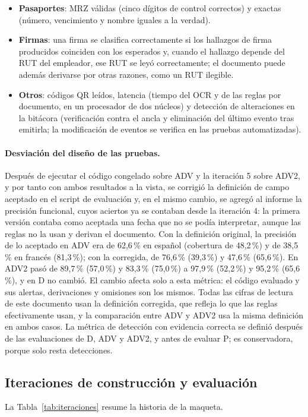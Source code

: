 \documentclass[11pt,a4paper]{article}
\begin{document}
\begin{itemize}
  \item \textbf{Pasaportes}: MRZ válidas (cinco dígitos de control correctos) y exactas (número, vencimiento y nombre iguales a la verdad).
  \item \textbf{Firmas}: una firma se clasifica correctamente si los hallazgos de firma producidos coinciden con los esperados y, cuando el hallazgo depende del RUT del empleador, ese RUT se leyó correctamente; el documento puede además derivarse por otras razones, como un RUT ilegible.
  \item \textbf{Otros}: códigos QR leídos, latencia (tiempo del OCR y de las reglas por documento, en un procesador de dos núcleos) y detección de alteraciones en la bitácora (verificación contra el ancla y eliminación del último evento tras emitirla; la modificación de eventos se verifica en las pruebas automatizadas).
\end{itemize}

\paragraph{Desviación del diseño de las pruebas.} Después de ejecutar el código congelado sobre ADV y la iteración 5 sobre ADV2, y por tanto con ambos resultados a la vista, se corrigió la definición de campo aceptado en el script de evaluación y, en el mismo cambio, se agregó al informe la precisión funcional, cuyos aciertos ya se contaban desde la iteración 4: la primera versión contaba como aceptada una fecha que no se podía interpretar, aunque las reglas no la usan y derivan el documento. Con la definición original, la precisión de lo aceptado en ADV era de 62,6\,\% en español (cobertura de 48,2\,\%) y de 38,5\,\% en francés (81,3\,\%); con la corregida, de 76,6\,\% (39,3\,\%) y 47,6\,\% (65,6\,\%). En ADV2 pasó de 89,7\,\% (57,0\,\%) y 83,3\,\% (75,0\,\%) a 97,9\,\% (52,2\,\%) y 95,2\,\% (65,6\,\%), y en D no cambió. El cambio afecta solo a esta métrica: el código evaluado y sus alertas, derivaciones y omisiones son los mismos. Todas las cifras de lectura de este documento usan la definición corregida, que refleja lo que las reglas efectivamente usan, y la comparación entre ADV y ADV2 usa la misma definición en ambos casos. La métrica de detección con evidencia correcta se definió después de las evaluaciones de D, ADV y ADV2, y antes de evaluar P; es conservadora, porque solo resta detecciones.

\subsection{Iteraciones de construcción y evaluación}
\label{sec:iteraciones}
La Tabla~\ref{tab:iteraciones} resume la historia de la maqueta.
\end{document}
